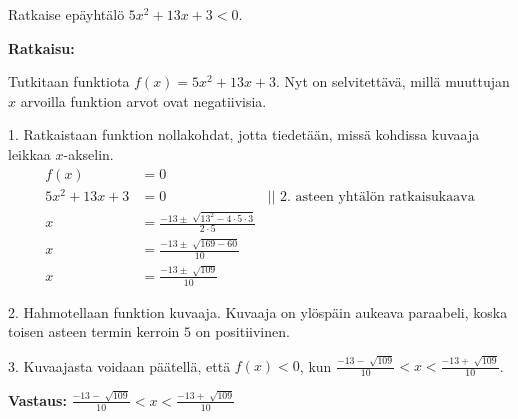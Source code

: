 \begin{esimerkki}
Ratkaise epäyhtälö $5x^2+13x+3<0$.

\textbf{Ratkaisu:}

Tutkitaan funktiota $f(x)=5x^2+13x+3$. Nyt on selvitettävä, millä muuttujan $x$ arvoilla funktion arvot ovat negatiivisia.

1. Ratkaistaan funktion nollakohdat, jotta tiedetään, missä kohdissa kuvaaja leikkaa $x$-akselin.
\begin{align*}
f(x)&=0 \\
5x^2+13x+3&=0 & || \text{ 2. asteen yhtälön ratkaisukaava}  \\
x&=\frac{-13 \pm \sqrt[]{13^2-4 \cdot 5 \cdot 3}}{2 \cdot 5} & \\
x&=\frac{-13 \pm \sqrt[]{169-60}}{10} & \\
x&=\frac{-13 \pm \sqrt[]{109}}{10} & 
\end{align*}

2. Hahmotellaan funktion kuvaaja.
Kuvaaja on ylöspäin aukeava paraabeli, koska toisen asteen termin kerroin $5$ on positiivinen. 

\begin{lukusuora}{-2.5}{2.5}{5}
\end{lukusuora}

3. Kuvaajasta voidaan päätellä, että $f(x)<0$, kun $\frac{-13 - \sqrt[]{109}}{10}<x< \frac{-13 + \sqrt[]{109}}{10}$.

\textbf{Vastaus:}
$\frac{-13 - \sqrt[]{109}}{10}<x< \frac{-13 + \sqrt[]{109}}{10}$

\end{esimerkki}

